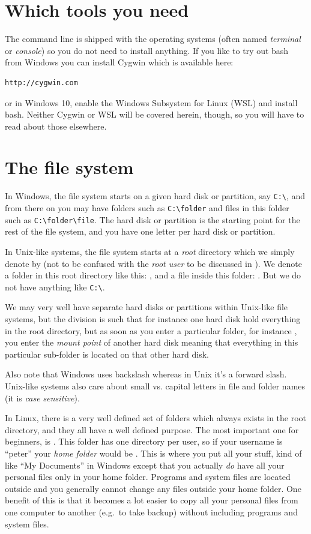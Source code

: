 \section{Which tools you need}
The command line is shipped with the operating systems (often named \emph{terminal} or \emph{console}) so you do not need to install anything. If you like to try out bash from Windows you can install Cygwin which is available here:

\begin{verbatim}
http://cygwin.com
\end{verbatim}
or in Windows 10, enable the Windows Subsystem for Linux (WSL) and install bash. Neither Cygwin or WSL will be covered herein, though, so you will have to read about those elsewhere.

\section{The file system}
In Windows, the file system starts on a given hard disk or partition, say \verb|C:\|, and from there on you may have folders such as \verb|C:\folder| and files in this folder such as \verb|C:\folder\file|. The hard disk or partition is the starting point for the rest of the file system, and you have one letter per hard disk or partition.

In Unix-like systems, the file system starts at a \emph{root} directory which we simply denote by \bashin{/} (not to be confused with the \emph{root user} to be discussed in ). We denote a folder in this root directory like this: , and a file inside this folder: . But we do not have anything like \verb|C:\|. 

We may very well have separate hard disks or partitions within Unix-like file systems, but the division is such that for instance one hard disk hold everything in the root directory, but as soon as you enter a particular folder, for instance , you enter the \emph{mount point} of another hard disk meaning that everything in this particular sub-folder is located on that other hard disk.

Also note that Windows uses backslash whereas in Unix it's a forward slash. Unix-like systems also care about small vs. capital letters in file and folder names (it is \emph{case sensitive}).

In Linux, there is a very well defined set of folders which always exists in the root directory, and they all have a well defined purpose. The most important one for beginners, is . This folder has one directory per user, so if your username is ``peter'' your \emph{home folder} would be . This is where you put all your stuff, kind of like ``My Documents'' in Windows except that you actually \emph{do} have all your personal files only in your home folder. Programs and system files are located outside  and you generally cannot change any files outside your home folder. One benefit of this is that it becomes a lot easier to copy all your personal files from one computer to another (e.g.\ to take backup) without including programs and system files.

